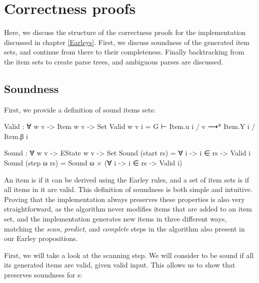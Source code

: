 
\chapter{Correctness proofs} \label{Correctness}

	Here, we discuss the structure of the correctness proofs for the
	implementation discussed in chapter \ref{Earleys}. First, we discuss
	soundness of the generated item sets, and continue from there to their
	completeness. Finally backtracking from the item sets to create parse
	trees, and ambiguous parses are discussed.

	\section{Soundness}

		First, we provide a definition of sound items sets:

		\begin{code}
			Valid : ∀ {w v} -> Item w v -> Set
			Valid {w} {v} i = G ⊢ Item.u i / v ⟶* Item.Y i / Item.β i

			Sound : ∀ {w v} -> EState w v -> Set
			Sound (start rs) = ∀ {i} -> i ∈ rs -> Valid i
			Sound (step ω rs) = Sound ω × (∀ {i} -> i ∈ rs -> Valid i)
		\end{code}

		An item is  if it can be derived using the Earley rules,
		and a set of item sets is  if all items in it are valid.
		This definition of soundness is both simple and intuitive. Proving that
		the implementation always preserves these properties is also very
		straightforward, as the algorithm never modifies items that are added
		to an item set, and the implementation generates new items in three
		different ways, matching the \emph{scan}, \emph{predict}, and
		\emph{complete} steps in the algorithm also present in our Earley
		propositions.

		First, we will take a look at the scanning step. We will consider
		 to be sound if all its generated items are valid, given
		valid input. This allows us to show that  preserves
		soundness for s:

